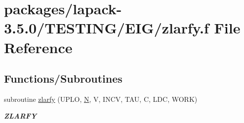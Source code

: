 \hypertarget{zlarfy_8f}{}\section{packages/lapack-\/3.5.0/\+T\+E\+S\+T\+I\+N\+G/\+E\+I\+G/zlarfy.f File Reference}
\label{zlarfy_8f}
\subsection*{Functions/\+Subroutines}
\begin{DoxyCompactItemize}
\item 
subroutine \hyperlink{group__complex16__eig_ga817c8e2419ed8d953bad714eb82d4c54}{zlarfy} (U\+P\+L\+O, \hyperlink{polmisc_8c_a0240ac851181b84ac374872dc5434ee4}{N}, V, I\+N\+C\+V, T\+A\+U, C, L\+D\+C, W\+O\+R\+K)
\begin{DoxyCompactList}\small\item\em {\bfseries Z\+L\+A\+R\+F\+Y} \end{DoxyCompactList}\end{DoxyCompactItemize}
